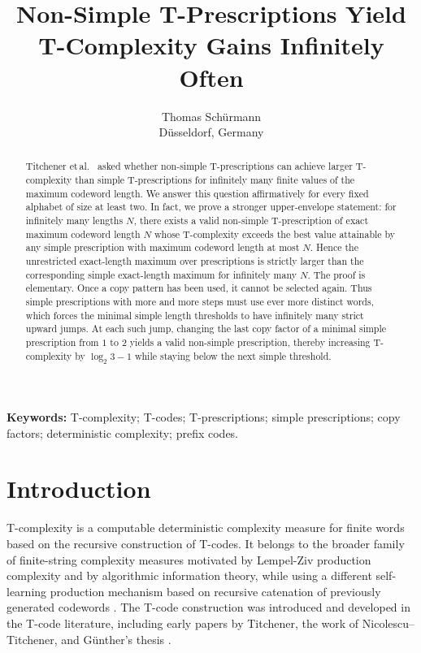 \documentclass[11pt]{article}
\title{Non-Simple T-Prescriptions Yield T-Complexity Gains Infinitely Often}
\author{Thomas Sch\"urmann\\D\"usseldorf, Germany}
\date{}
\begin{document}
\maketitle

\begin{abstract}
	Titchener et\,al.~\cite{TitchenerEtAl2005} asked whether non-simple
	T-prescriptions can achieve larger T-complexity than simple T-prescriptions
	for infinitely many finite values of the maximum codeword length. We answer
	this question affirmatively for every fixed alphabet of size at least two.
	In fact, we prove a stronger upper-envelope statement: for infinitely many
	lengths $N$, there exists a valid non-simple T-prescription of exact maximum
	codeword length $N$ whose T-complexity exceeds the best value attainable by
	any simple prescription with maximum codeword length at most $N$. Hence the
	unrestricted exact-length maximum over prescriptions is strictly larger than
	the corresponding simple exact-length maximum for infinitely many $N$.
	The proof is elementary. Once a copy pattern has been used, it cannot be
	selected again. Thus simple prescriptions with more and more steps must use
	ever more distinct words, which forces the minimal simple length thresholds
	to have infinitely many strict upward jumps. At each such jump, changing the
	last copy factor of a minimal simple prescription from $1$ to $2$ yields a
	valid non-simple prescription, thereby increasing T-complexity by
	$\log_2 3-1$ while staying below the next simple threshold.
\end{abstract}


\noindent\textbf{Keywords:} T-complexity; T-codes; T-prescriptions; simple prescriptions; copy factors; deterministic complexity; prefix codes.

\section{Introduction}

T-complexity is a computable deterministic complexity measure for finite words based on the recursive construction of T-codes. It belongs to the broader family of finite-string complexity measures motivated by Lempel-Ziv production complexity and by algorithmic information theory, while using a different self-learning production mechanism based on recursive catenation of previously generated codewords \cite{LempelZiv1976,Solomonoff1964,Kolmogorov1965,Chaitin1966,TitchenerEtAl2005}. The T-code construction was introduced and developed in the T-code literature, including early papers by Titchener, the work of Nicolescu--Titchener, and G\"unther's thesis \cite{Titchener1984,Titchener1996,NicolescuTitchener1998,Guenther1998}.
\end{document}
